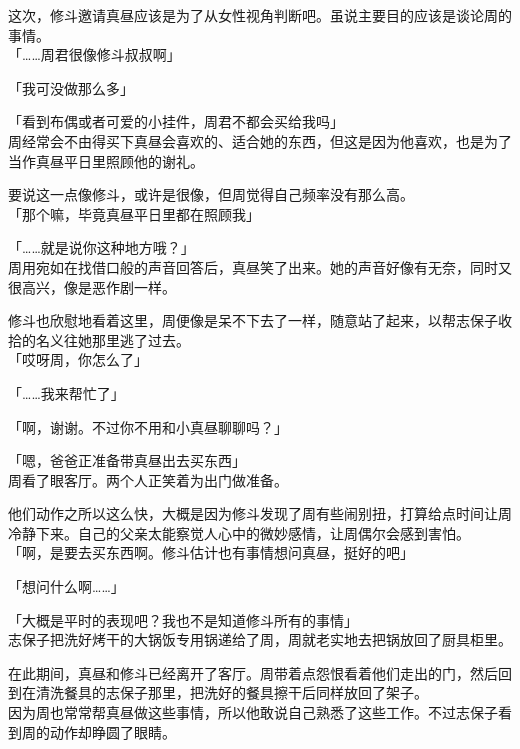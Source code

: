 这次，修斗邀请真昼应该是为了从女性视角判断吧。虽说主要目的应该是谈论周的事情。\\

「……周君很像修斗叔叔啊」

「我可没做那么多」

「看到布偶或者可爱的小挂件，周君不都会买给我吗」\\

周经常会不由得买下真昼会喜欢的、适合她的东西，但这是因为他喜欢，也是为了当作真昼平日里照顾他的谢礼。

要说这一点像修斗，或许是很像，但周觉得自己频率没有那么高。\\

「那个嘛，毕竟真昼平日里都在照顾我」

「……就是说你这种地方哦？」\\

周用宛如在找借口般的声音回答后，真昼笑了出来。她的声音好像有无奈，同时又很高兴，像是恶作剧一样。

修斗也欣慰地看着这里，周便像是呆不下去了一样，随意站了起来，以帮志保子收拾的名义往她那里逃了过去。\\

「哎呀周，你怎么了」

「……我来帮忙了」

「啊，谢谢。不过你不用和小真昼聊聊吗？」

「嗯，爸爸正准备带真昼出去买东西」\\

周看了眼客厅。两个人正笑着为出门做准备。

他们动作之所以这么快，大概是因为修斗发现了周有些闹别扭，打算给点时间让周冷静下来。自己的父亲太能察觉人心中的微妙感情，让周偶尔会感到害怕。\\

「啊，是要去买东西啊。修斗估计也有事情想问真昼，挺好的吧」

「想问什么啊……」

「大概是平时的表现吧？我也不是知道修斗所有的事情」\\

志保子把洗好烤干的大锅饭专用锅递给了周，周就老实地去把锅放回了厨具柜里。

在此期间，真昼和修斗已经离开了客厅。周带着点怨恨看着他们走出的门，然后回到在清洗餐具的志保子那里，把洗好的餐具擦干后同样放回了架子。\\

因为周也常常帮真昼做这些事情，所以他敢说自己熟悉了这些工作。不过志保子看到周的动作却睁圆了眼睛。\\

